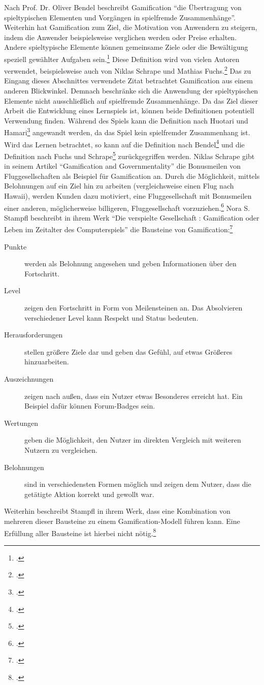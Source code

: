 	Nach Prof. Dr. Oliver Bendel beschreibt Gamification \enquote{die Übertragung von spieltypischen Elementen und Vorgängen in spielfremde Zusammenhänge}. Weiterhin hat Gamification zum Ziel, die Motivation von Anwendern zu steigern, indem die Anwender beispielsweise verglichen werden oder Preise erhalten. Andere spieltypische Elemente können gemeinsame Ziele oder die Bewältigung speziell gewählter Aufgaben sein.\footcite{gabler-gamification} Diese Definition wird von vielen Autoren verwendet, beispielsweise auch von Niklas Schrape und Mathias Fuchs.\footcite{gamification2}
	Das zu Eingang dieses Abschnittes verwendete Zitat betrachtet Gamification aus einem anderen Blickwinkel. Demnach beschränke sich die Anwendung der spieltypischen Elemente nicht ausschließlich auf spielfremde Zusammenhänge. Da das Ziel dieser Arbeit die Entwicklung eines Lernspiels ist, können beide Definitionen potentiell Verwendung finden. Während des Spiels kann die Definition nach Huotari und Hamari\footcite{gamification} angewandt werden, da das Spiel kein spielfremder Zusammenhang ist. Wird das Lernen betrachtet, so kann auf die Definition nach Bendel\footcite{gabler-gamification} und die Definition nach Fuchs und Schrape\footcite{gamification2} zurückgegriffen werden.
    Niklas Schrape gibt in seinem Artikel \enquote{Gamification and Governmentality} die Bonusmeilen von Fluggesellschaften als Beispiel für Gamification an. Durch die Möglichkeit, mittels Belohnungen auf ein Ziel hin zu arbeiten (vergleichsweise einen Flug nach Hawaii), werden Kunden dazu motiviert, eine Fluggesellschaft mit Bonusmeilen einer anderen, möglicherweise billigeren, Fluggesellschaft vorzuziehen.\footcite[S.26ff]{gamification2}
    Nora S. Stampfl beschreibt in ihrem Werk \enquote{Die verspielte Gesellschaft : Gamification oder Leben im Zeitalter des Computerspiels} die Bausteine von Gamification:\footcite{stampfl2012verspielte}
    \begin{description}
    	\item[Punkte]{werden als Belohnung angesehen und geben Informationen über den Fortschritt.}
    	\item[Level]{zeigen den Fortschritt in Form von Meilensteinen an. Das Absolvieren verschiedener Level kann Respekt und Status bedeuten.}
    	\item[Herausforderungen]{stellen größere Ziele dar und geben das Gefühl, auf etwas Größeres hinzuarbeiten.}
    	\item[Auszeichnungen]{zeigen nach außen, dass ein Nutzer etwas Besonderes erreicht hat. Ein Beispiel dafür können Forum-Badges sein.}
    	\item[Wertungen]{geben die Möglichkeit, den Nutzer im direkten Vergleich mit weiteren Nutzern zu vergleichen.}
    	\item[Belohnungen]{sind in verschiedensten Formen möglich und zeigen dem Nutzer, dass die getätigte Aktion korrekt und gewollt war.}
    \end{description}
    Weiterhin beschreibt Stampfl in ihrem Werk, dass eine Kombination von mehreren dieser Bausteine zu einem Gamification-Modell führen kann. Eine Erfüllung aller Bausteine ist hierbei nicht nötig.\footcite{stampfl2012verspielte}

